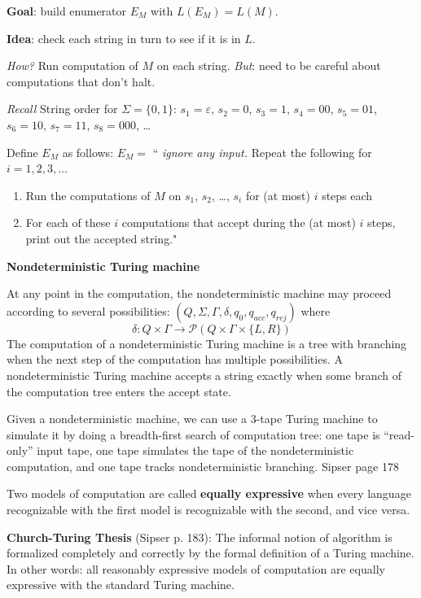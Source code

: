 \documentclass[12pt, oneside]{article}
\begin{document}
{\bf Goal}: build enumerator $E_M$ with $L(E_M) = L(M)$.

{\bf Idea}: check each string in turn to see if it is in $L$.

{\it How?} Run computation of $M$ on each string.  {\it But}: need to be careful 
about computations that don't halt.

{\it Recall} String order for $\Sigma = \{0,1\}$: $s_1 = \varepsilon$, $s_2 = 0$, $s_3 = 1$, $s_4 = 00$, $s_5 = 01$, $s_6  = 10$, 
$s_7  =  11$, $s_8 = 000$, \ldots

Define $E_M$ as follows: $E_{M} = $ `` {\it ignore any input.} Repeat the following for $i=1, 2, 3, \ldots$
\begin{enumerate}
  \item Run the computations of $M$ on $s_1$, $s_2$, \ldots, $s_i$ for (at most) $i$ steps each
  \item For each of these $i$ computations that accept during the (at most) $i$ steps, print
  out the accepted string."
\end{enumerate}

\newpage

{\bf Nondeterministic Turing machine}

At any point in the computation, the nondeterministic machine may proceed according to 
several possibilities: $(Q, \Sigma, \Gamma, \delta, q_0, q_{acc}, q_{rej})$ where 
\[
\delta: Q \times \Gamma \to \mathcal{P}(Q \times \Gamma \times \{L, R\})  
\]
The computation of a nondeterministic Turing machine is a tree with branching
when the next step of the computation has multiple possibilities. A nondeterministic
Turing machine accepts a string exactly when some branch of the computation tree 
enters the accept state.

Given a nondeterministic machine, we can use a $3$-tape Turing machine to 
simulate it by doing a breadth-first search of computation tree: one tape 
is ``read-only'' input tape, one tape simulates the tape of the nondeterministic
computation, and one tape tracks nondeterministic branching. {\tiny Sipser page 178} 

\vfill
Two models of computation are called {\bf equally expressive} when 
every language recognizable with the first model is recognizable with the second, and vice versa.

{\bf  Church-Turing Thesis} (Sipser p. 183): The informal notion of algorithm is formalized completely  and correctly by the 
formal definition of a  Turing machine. In other words: all reasonably expressive models of 
computation are equally expressive with the standard Turing machine.
\end{document}
